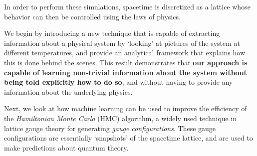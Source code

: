 \begin{doublespace}
%
In order to perform these simulations, spacetime is discretized as a lattice
whose behavior can then be controlled using the laws of physics.

We begin by introducing a new technique that is capable of extracting
information about a physical system by `looking' at pictures of the system at
different temperatures, and provide an analytical framework that explains how
this is done behind the scenes.
%
This result demonstrates that \textbf{our approach is capable of learning
non-trivial information about the system without being told explicitly how to
do so}, and without having to provide any information about the underlying
physics.
%

Next, we look at how machine learning can be used to improve the efficiency of the \emph{Hamiltonian Monte Carlo} (HMC)
algorithm, a widely used technique in lattice gauge theory for generating \emph{gauge configurations}.
%
These gauge configurations are essentially `snapshots' of the spacetime lattice, and are used to make predictions
about quantum theory.


\end{doublespace}
